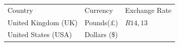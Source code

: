 \begin{enumerate}[noitemsep, label=\textbf{\arabic*}. ]
{\begin{tabular}[t]{|l|l|l|}
        Country &
    
    
        Currency &
    
    
        Exchange Rate%
     \tabularnewline\cline{1-1}\cline{2-2}\cline{3-3}
    
    
        United Kingdom (UK) &
    
    
        Pounds(£) &
    
    
        \begin{math}R14,13\end{math}%
     \tabularnewline\cline{1-1}\cline{2-2}\cline{3-3}
    
    
        United States (USA) &
    
    
        Dollars (\$) &
    

\end{tabular}}
\end{enumerate}
